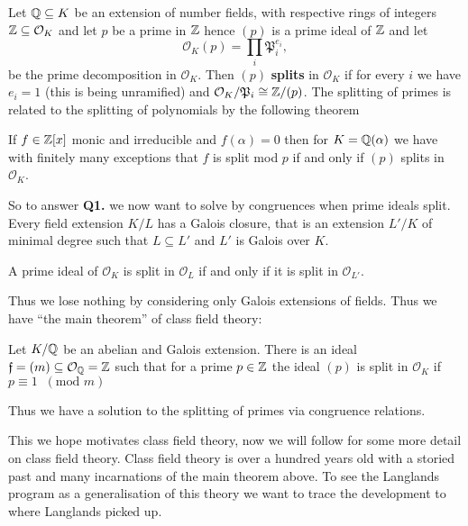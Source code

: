 Let \(\Q \subseteq K\) be an extension of number fields, with respective rings of integers \(\Z \subseteq \mathcal{O}_K\) and let \(p\) be a prime in \(\Z\) hence \((p)\) is a prime ideal of \(\Z\) and let 
\[\mathcal{O}_K(p) = \prod_i \mathfrak{P}_i^{e_i},\]
be the prime decomposition in \(\mathcal{O}_K\). Then \((p)\) \textbf{splits} in \(\mathcal{O}_K\) if for every \(i\) we  have \(e_i = 1\) (this is being unramified) and \(\mathcal{O}_K/\mathfrak{P}_i \cong \Z/(p)\). The splitting of primes is related to the splitting of polynomials by the following theorem
\begin{Theorem}
	If \(f\in \Z[x]\) monic and irreducible and \(f(\alpha) = 0\) then for \(K = \Q(\alpha)\) we have with finitely many exceptions that \(f\) is split mod \(p\) if and only if \((p)\) splits in \(\mathcal{O}_K\).
\end{Theorem}
\begin{example}
	
\end{example}
So to answer \textbf{Q1.} we now want to solve by congruences when prime ideals split. Every field extension \(K/L\) has a Galois closure, that is an extension \(L'/K\) of minimal degree such that \(L\subseteq L'\) and \(L'\) is Galois over \(K\). 
\begin{Lemma}
	A prime ideal of \(\mathcal{O}_K\) is split in \(\mathcal{O}_L\) if and only if it is split in \(\mathcal{O}_{L'}\).
\end{Lemma}
Thus we lose nothing by considering only Galois extensions of fields. Thus we have ``the main theorem'' of class field theory:
\begin{Theorem}\label{thm:reciprocity}
	Let \(K/\Q\) be an abelian and Galois extension. There is an ideal \(\mathfrak{f} = (m)\subseteq \mathcal{O}_\Q = \Z\) such that for a prime \(p\in \Z\) the ideal \((p)\) is split in \(\mathcal{O}_K\) if \(p\equiv 1 \;\; (\text{mod }m)\)
\end{Theorem} 
Thus we have a solution to the splitting of primes via congruence relations. 

\begin{example}
	
\end{example}

This we hope motivates class field theory, now we will follow \cite{conradHISTORYCLASSFIELD} for some more detail on class field theory. Class field theory is over a hundred years old with a storied past and many incarnations of the main theorem above. To see the Langlands program as a generalisation of this theory we want to trace the development to where Langlands picked up. 

